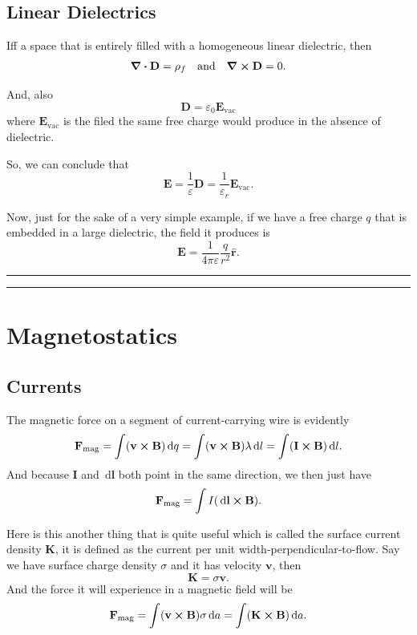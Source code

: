 \documentclass[12pt,english]{article}
\newcommand{\dmr}[1]{\, \mathrm{d}#1} %
\numberwithin{equation}{subsection}
\let\oldhat\hat
\renewcommand{\vec}[1]{\mathbf{#1}}
\renewcommand{\hat}[1]{\oldhat{\mathbf{#1}}}
\begin{document}
\subsection{Linear Dielectrics}
Iff a space that is entirely filled with a homogeneous linear dielectric, then 
\begin{align*}
    \div \vec{D} = \rho_f &&\text{and}&& \curl \vec{D} =0.
\end{align*}

And, also
\[
    \vec{D} = \varepsilon_0 \vec{E}_{\text{vac}}
\]
where $\vec{E}_{\text{vac}}$ is the filed the same free charge would produce in the absence of dielectric.

So, we can conclude that
\begin{equation}
    \vec{E} = \frac{1}{\varepsilon} \vec{D} = \frac{1}{\varepsilon_r}\vec{E}_{\text{vac}}.
\end{equation}

Now, just for the sake of a very simple example, if we have a free charge $q$ that is embedded in a large dielectric, the field it produces is 
\begin{equation}
    \vec{E} = \frac{1}{4 \pi \varepsilon} \frac{q}{r^2} \hat{r}.
\end{equation}

\par\noindent\rule{\textwidth}{0.4pt}
\par\noindent\rule{\textwidth}{0.4pt}
\section{Magnetostatics}
\subsection{Currents}
The magnetic force on a segment of current-carrying wire is evidently 
\begin{equation}
    \vec{F}_{\text{mag}} = \int (\vec{v}\cross\vec{B}) \dmr{q} = \int (\vec{v}\cross\vec{B})\lambda\dmr{l} = \int(\vec{I}\cross\vec{B})\dmr{l}.
\end{equation}
And because $\vec{I}$ and $\dmr{\vec{l}}$ both point in the same direction, we then just have
\begin{equation}
    \vec{F}_{\text{mag}} =\int I(\dmr{\vec{l}}\cross \vec{B}).
\end{equation}

Here is this another thing that is quite useful which is called the surface current density $\vec{K}$, it is defined as the current per unit width-perpendicular-to-flow. Say we have surface charge density $\sigma$ and it has velocity $\vec{v}$, then
\begin{equation}
    \vec{K} = \sigma \vec{v}.
\end{equation}
And the force it will experience in a magnetic field will be
\begin{equation}
    \vec{F}_{\text{mag}}=\int (\vec{v} \cross \vec{B})\sigma \dmr{a} = \int (\vec{K}\cross \vec{B})\dmr{a}.
\end{equation}
\end{document}
